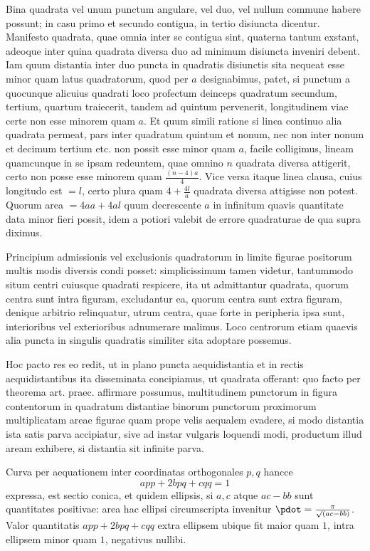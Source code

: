 Bina quadrata vel unum punctum angulare, vel duo, vel nullum commune habere possunt; in casu primo et secundo contigua, in tertio disiuncta dicentur. Manifesto quadrata, quae omnia inter se contigua sint, quaterna tantum exstant, adeoque inter quina quadrata diversa duo ad minimum disiuncta inveniri debent. Iam quum distantia inter duo puncta in quadratis disiunctis sita nequeat esse minor quam latus quadratorum, quod per $a$ designabimus, patet, si punctum a quocunque alicuius quadrati loco profectum deinceps quadratum secundum, tertium, quartum traiecerit, tandem ad quintum pervenerit, longitudinem viae certe non esse minorem quam $a$. Et quum simili ratione si linea continuo alia quadrata permeat, pars inter quadratum quintum et nonum, nec non inter nonum et decimum tertium etc. non possit esse minor quam $a$, facile colligimus, lineam quamcunque in se ipsam redeuntem, quae omnino $n$ quadrata diversa attigerit, certo non posse esse minorem quam $\frac{(n-4)a}4$. Vice versa itaque linea clausa, cuius longitudo est $=l$, certo plura quam $4+\frac{4l}a$ quadrata diversa attigisse non potest. Quorum area $=4aa+4al$ quum decrescente $a$ in infinitum quavis quantitate data minor fieri possit, idem a potiori valebit de errore quadraturae de qua supra diximus.

Principium admissionis vel exclusionis quadratorum in limite figurae positorum multis modis diversis condi posset: simplicissimum tamen videtur, tantummodo situm centri cuiusque quadrati respicere, ita ut admittantur quadrata, quorum centra sunt intra figuram, excludantur ea, quorum centra sunt extra figuram, denique arbitrio relinquatur, utrum centra, quae forte in peripheria ipsa sunt, interioribus vel exterioribus adnumerare malimus. Loco centrorum etiam quaevis alia puncta in singulis quadratis similiter sita adoptare possemus.

Hoc pacto res eo redit, ut in plano puncta aequidistantia et in rectis aequidistantibus ita disseminata concipiamus, ut quadrata offerant: quo facto per theorema art. praec. affirmare possumus, multitudinem punctorum in figura contentorum in quadratum distantiae binorum punctorum proximorum multiplicatam areae figurae quam prope velis aequalem evadere, si modo distantia ista satis parva accipiatur, sive ad instar vulgaris loquendi modi, productum illud aream exhibere, si distantia sit infinite parva.

Curva per aequationem inter coordinatas orthogonales $p,q$ hancce
\[
app+2bpq+cqq=1
\]
expressa, est sectio conica, et quidem ellipsis, si $a,c$ atque $ac-bb$ sunt quantitates positivae: area hac ellipsi circumscripta invenitur $\pdot=\frac\pi{\surd(ac-bb)}$. Valor quantitatis $app+2bpq+cqq$ extra ellipsem ubique fit maior quam $1$, intra ellipsem minor quam $1$, negativus nullibi.


